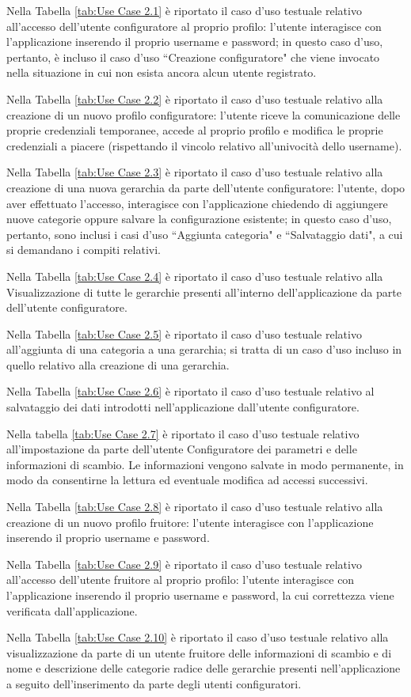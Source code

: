 Nella Tabella \ref{tab:Use Case 2.1} è riportato il caso d'uso testuale relativo all'accesso dell'utente configuratore al proprio profilo: l'utente interagisce con l'applicazione inserendo il proprio username e password; in questo caso d'uso, pertanto, è incluso il caso d'uso ``Creazione configuratore" che viene invocato nella situazione in cui non esista ancora alcun utente registrato.\bigskip

Nella Tabella \ref{tab:Use Case 2.2} è riportato il caso d'uso testuale relativo alla creazione di un nuovo profilo configuratore: l'utente riceve la comunicazione delle proprie credenziali temporanee, accede al proprio profilo e modifica le proprie credenziali a piacere (rispettando il vincolo relativo all'univocità dello username).\bigskip

Nella Tabella \ref{tab:Use Case 2.3} è riportato il caso d'uso testuale relativo alla creazione di una nuova gerarchia da parte dell'utente configuratore: l'utente, dopo aver effettuato l'accesso, interagisce con l'applicazione chiedendo di aggiungere nuove categorie oppure salvare la configurazione esistente; in questo caso d'uso, pertanto, sono inclusi i casi d'uso ``Aggiunta categoria" e ``Salvataggio dati", a cui si demandano i compiti relativi.\bigskip

Nella Tabella \ref{tab:Use Case 2.4} è riportato il caso d'uso testuale relativo alla Visualizzazione di tutte le gerarchie presenti all'interno dell'applicazione da parte dell'utente configuratore.\bigskip

Nella Tabella \ref{tab:Use Case 2.5} è riportato il caso d'uso testuale relativo all'aggiunta di una categoria a una gerarchia; si tratta di un caso d'uso incluso in quello relativo alla creazione di una gerarchia.\bigskip

Nella Tabella \ref{tab:Use Case 2.6} è riportato il caso d'uso testuale relativo al salvataggio dei dati introdotti nell'applicazione dall'utente configuratore.\bigskip

Nella tabella \ref{tab:Use Case 2.7} è riportato il caso d'uso testuale relativo all'impostazione da parte dell'utente Configuratore dei parametri e delle informazioni di scambio.
Le informazioni vengono salvate in modo permanente, in modo da consentirne la lettura ed eventuale modifica ad accessi successivi.\bigskip

Nella Tabella \ref{tab:Use Case 2.8} è riportato il caso d'uso testuale relativo alla creazione di un nuovo profilo fruitore: l'utente interagisce con l'applicazione inserendo il proprio username e password.\bigskip

Nella Tabella \ref{tab:Use Case 2.9} è riportato il caso d'uso testuale relativo all'accesso dell'utente fruitore al proprio profilo: l'utente interagisce con l'applicazione inserendo il proprio username e password, la cui correttezza viene verificata dall'applicazione.\bigskip

Nella Tabella \ref{tab:Use Case 2.10} è riportato il caso d'uso testuale relativo alla visualizzazione da parte di un utente fruitore delle informazioni di scambio e di nome e descrizione delle categorie radice delle gerarchie presenti nell'applicazione a seguito dell'inserimento da parte degli utenti configuratori.\bigskip

